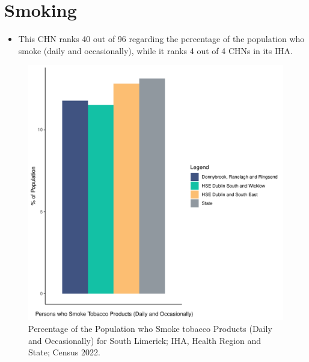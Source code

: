 \documentclass{article}
\begin{document}
\pagebreak

\section{Smoking}\label{sect:Smoking}
\begin{itemize}
\item This CHN ranks  40 out of 96 regarding the percentage of the population who smoke (daily and occasionally), while it ranks   4 out of 4 CHNs in its IHA.
\end{itemize}
\begin{figure}[H]
	\centering
	\includegraphics[width = 120mm]{../figures/SmokingED.pdf}
	\caption{Percentage of the Population who Smoke tobacco Products (Daily and Occasionally) for South Limerick; IHA, Health Region and State; Census 2022.}
	\label{fig:2ae19629-1a6a-13a3-e055-000000000001}
	\end{figure}
	
\end{document}
